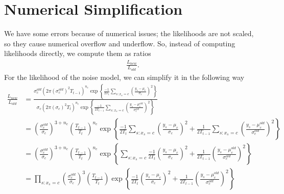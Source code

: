 \documentclass[10pt,letterpaper]{article}
\begin{document}
\section{Numerical Simplification}
We have some errors because of numerical issues; the likelihoods are not scaled, so they cause numerical overflow and underflow.
So, instead of computing likelihoods directly, we compute them as ratios \begin{align*}
    \frac{L_{new}}{L_{old}}.
\end{align*}
For the likelihood of the noise model, we can simplify it in the following way
\begin{align*}
    \frac{L_{new}}{L_{old}} &= \frac{\sigma_c^{old} (2 \pi (\sigma_c^{old})^2 T_{t-1})^{n_c} \exp \left\{ \frac{-1}{2 T_t} \sum_{s: x_s = c} \left( \frac{y_s - \mu_c}{\sigma_c} \right)^2 \right\} }{ \sigma_c (2 \pi (\sigma_c)^2 T_t)^{n_c} \exp \left\{ \frac{-1}{2 T_{t-1}} \sum_{s: x_s = c} \left( \frac{y_s - \mu_c^{old}}{\sigma_c^{old}} \right)^2 \right\}} \\
    &= \left( \frac{\sigma_c^{old}}{\sigma_c} \right)^{3 + n_c} \left( \frac{T_{t-1}}{T_t} \right)^{n_c} \exp \left\{ \frac{-1}{2 T_t} \sum_{s: x_s = c} \left( \frac{y_s - \mu_c}{\sigma_c} \right)^2 + \frac{1}{2 T_{t-1}} \sum_{s: x_s = c} \left( \frac{y_s - \mu_c^{old}}{\sigma_c^{old}} \right)^2  \right\} \\
    &= \left( \frac{\sigma_c^{old}}{\sigma_c} \right)^{3 + n_c} \left( \frac{T_{t-1}}{T_t} \right)^{n_c} \exp \left\{  \sum_{s: x_s = c} \frac{-1}{2 T_t} \left( \frac{y_s - \mu_c}{\sigma_c} \right)^2 + \frac{1}{2 T_{t-1}} \left( \frac{y_s - \mu_c^{old}}{\sigma_c^{old}} \right)^2  \right\} \\
    &= \prod_{s: x_s = c} \left( \frac{\sigma_c^{old}}{\sigma_c} \right)^{3} \left( \frac{T_{t-1}}{T_t} \right) \exp \left\{ \frac{-1}{2 T_t} \left( \frac{y_s - \mu_c}{\sigma_c} \right)^2 + \frac{1}{2 T_{t-1}} \left( \frac{y_s - \mu_c^{old}}{\sigma_c^{old}} \right)^2  \right\}
\end{align*}
\end{document}

